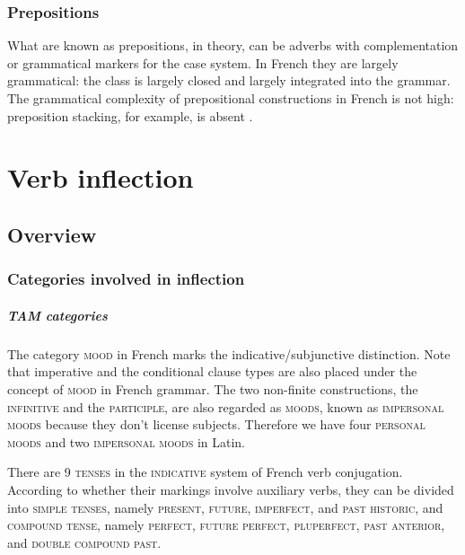 \documentclass[a4paper, oneside, 12pt]{report}
\newcommand*{\category}[1]{\textsc{#1}}
\begin{document}
\subsection{Prepositions}

What are known as prepositions, in theory, can be adverbs with complementation
or grammatical markers for the case system.
In French they are largely grammatical:
the class is largely closed and largely integrated into the grammar.
The grammatical complexity of prepositional constructions in French is not high:
preposition stacking, for example, is absent .

\chapter{Verb inflection}

\section{Overview}

\subsection{Categories involved in inflection}\label{sec:verb-inflection.overview.categories}

\paragraph*{TAM categories}
The category \category{mood} in French marks the indicative/subjunctive distinction.
Note that imperative and the conditional clause types
are also placed under the concept of \category{mood} in French grammar.
The two non-finite constructions, the \category{infinitive} and the \category{participle},
are also regarded as \category{moods},
known as \category{impersonal moods} because they don't license subjects.
Therefore we have four \category{personal moods} and two \category{impersonal moods} in Latin.

There are 9 \category{tenses} in the \category{indicative} system of French verb conjugation.
According to whether their markings involve auxiliary verbs,
they can be divided into \category{simple tenses}, namely \category{present}, \category{future}, \category{imperfect}, and \category{past historic},
and \category{compound tense}, namely \category{perfect}, \category{future perfect}, \category{pluperfect}, \category{past anterior}, and \category{double compound past}.
\end{document}
